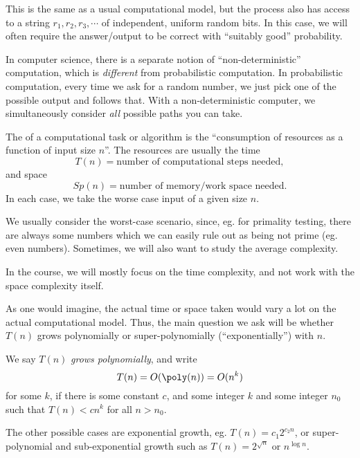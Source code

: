 \documentclass[a4paper]{article}
\begin{document}
\begin{defi}
  This is the same as a usual computational model, but the process also has access to a string $r_1, r_2, r_3, \cdots$ of independent, uniform random bits. In this case, we will often require the answer/output to be correct with ``suitably good'' probability.
\end{defi}

In computer science, there is a separate notion of ``non-deterministic'' computation, which is \emph{different} from probabilistic computation. In probabilistic computation, every time we ask for a random number, we just pick one of the possible output and follows that. With a non-deterministic computer, we simultaneously consider \emph{all} possible paths you can take.

\begin{defi}
  The  of a computational task or algorithm is the ``consumption of resources as a function of input size $n$''. The resources are usually the time
  \[
    T(n) = \text{number of computational steps needed},
  \]
  and space
  \[
    Sp(n) = \text{number of memory/work space needed}.
  \]
  In each case, we take the worse case input of a given size $n$.
\end{defi}
We usually consider the worst-case scenario, since, eg. for primality testing, there are always some numbers which we can easily rule out as being not prime (eg. even numbers). Sometimes, we will also want to study the average complexity.

In the course, we will mostly focus on the time complexity, and not work with the space complexity itself.

As one would imagine, the actual time or space taken would vary a lot on the actual computational model. Thus, the main question we ask will be whether $T(n)$ grows polynomially or super-polynomially (``exponentially'') with $n$.
\begin{defi}
  We say $T(n)$ \emph{grows polynomially}, and write
  \[
    T(n) = O(\poly(n)) = O(n^k)
  \]
  for some $k$, if there is some constant $c$, and some integer $k$ and some integer $n_0$ such that $T(n) < c n^k$ for all $n > n_0$.
\end{defi}

The other possible cases are exponential growth, eg. $T(n) = c_1 2^{c_2 n}$, or super-polynomial and sub-exponential growth such as $T(n) = 2^{\sqrt{n}}$ or $n^{\log n}$.
\end{document}
